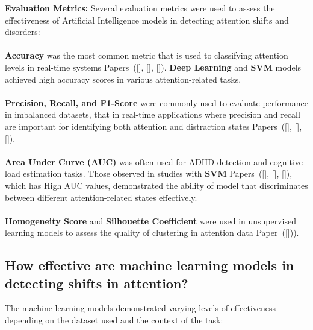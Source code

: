 \documentclass[twocolumn,12pt]{article}
\begin{document}
{\textbf{Evaluation Metrics:} Several evaluation metrics were used to assess the effectiveness of Artificial Intelligence models in detecting attention shifts and disorders:  \\ \\
\textbullet \textbf{Accuracy} was the most common metric that is used to classifying attention levels in real-time systems Papers~([\citealp{ref1}], [\citealp{ref3}], [\citealp{ref8}]). \textbf{Deep Learning} and \textbf{SVM} models achieved high accuracy scores in various attention-related tasks.  \\ \\
\textbullet \textbf{Precision, Recall, and F1-Score} were commonly used to evaluate performance in imbalanced datasets, that in real-time applications where precision and recall are important for identifying both attention and distraction states Papers~([\citealp{ref2}], [\citealp{ref6}], [\citealp{ref9}]).  \\ \\
\textbullet \textbf{Area Under Curve (AUC)} was often used for ADHD detection and cognitive load estimation tasks. Those observed in studies with \textbf{SVM} Papers~([\citealp{ref11}], [\citealp{ref12}], [\citealp{ref19}]), which has High AUC values, demonstrated the ability of model that discriminates between different attention-related states effectively.  \\ \\
\textbullet \textbf{Homogeneity Score} and \textbf{Silhouette Coefficient} were used in unsupervised learning models to assess the quality of clustering in attention data Paper~([\citealp{ref4}])).  \\ 

\subsection{How effective are machine learning models in detecting shifts in attention?} 
The machine learning models demonstrated varying levels of effectiveness depending on the dataset used and the context of the task: \\ 

}
\end{document}
